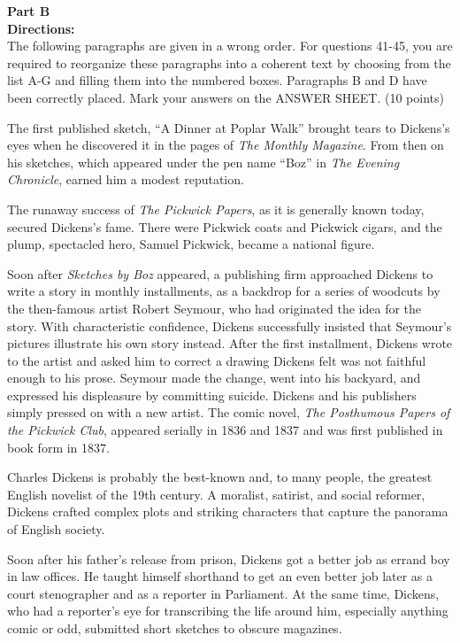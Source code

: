 \newpage

\noindent
\textbf{Part B}\\
\textbf{Directions:}\\
The following paragraphs are given in a wrong order. For questions
41-45, you are required to reorganize these paragraphs into a coherent
text by choosing from the list A-G and filling them into the numbered
boxes. Paragraphs B and D have been correctly placed. Mark your
answers on the ANSWER SHEET. (10 points)


\begin{listmatch}


\item 
The first published sketch, ``A Dinner at Poplar Walk'' brought tears
to Dickens's eyes when he discovered it in the pages of \emph{The Monthly Magazine}. From then on his sketches, which appeared under the
pen name ``Boz'' in \emph{The Evening Chronicle}, earned him a modest
reputation.


\item 
The runaway success of \emph{The Pickwick Papers}, as it is generally
known today, secured Dickens's fame. There were Pickwick coats and
Pickwick cigars, and the plump, spectacled hero, Samuel Pickwick, became
a national figure.


\item 
Soon after \emph{Sketches by Boz} appeared, a publishing firm
approached Dickens to write a story in monthly installments, as a
backdrop for a series of woodcuts by the then-famous artist Robert
Seymour, who had originated the idea for the story. With characteristic
confidence, Dickens successfully insisted that Seymour's pictures
illustrate his own story instead. After the first installment, Dickens
wrote to the artist and asked him to correct a drawing Dickens felt was
not faithful enough to his prose. Seymour made the change, went into his
backyard, and expressed his displeasure by committing suicide. Dickens
and his publishers simply pressed on with a new artist. The comic novel,
\emph{The Posthumous Papers of the Pickwick Club}, appeared serially in
1836 and 1837 and was first published in book form in 1837.


\item 
Charles Dickens is probably the best-known and, to many people, the
greatest English novelist of the 19th century. A moralist, satirist, and
social reformer, Dickens crafted complex plots and striking characters
that capture the panorama of English society.


\item 
Soon after his father's release from prison, Dickens got a better job
as errand boy in law offices. He taught himself shorthand to get an even
better job later as a court stenographer and as a reporter in
Parliament. At the same time, Dickens, who had a reporter's eye for
transcribing the life around him, especially anything comic or odd,
submitted short sketches to obscure magazines.



\end{listmatch}
